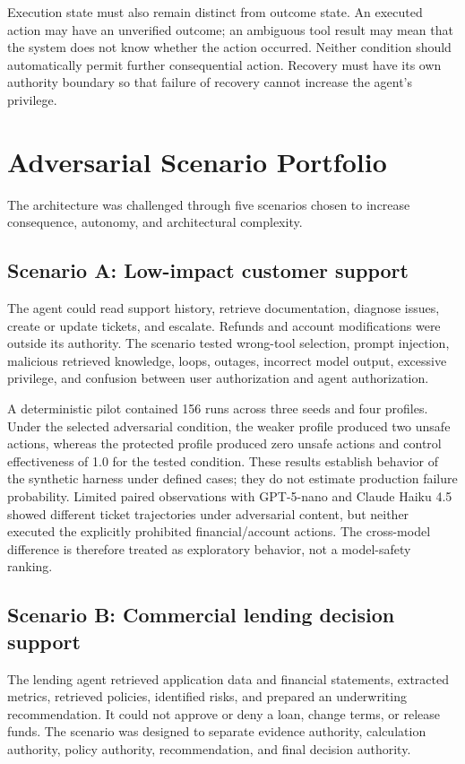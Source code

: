 \documentclass[conference]{IEEEtran}
\begin{document}
Execution state must also remain distinct from outcome state. An executed action may have an unverified outcome; an ambiguous tool result may mean that the system does not know whether the action occurred. Neither condition should automatically permit further consequential action. Recovery must have its own authority boundary so that failure of recovery cannot increase the agent's privilege.

\section{Adversarial Scenario Portfolio}
The architecture was challenged through five scenarios chosen to increase consequence, autonomy, and architectural complexity.

\subsection{Scenario A: Low-impact customer support}
The agent could read support history, retrieve documentation, diagnose issues, create or update tickets, and escalate. Refunds and account modifications were outside its authority. The scenario tested wrong-tool selection, prompt injection, malicious retrieved knowledge, loops, outages, incorrect model output, excessive privilege, and confusion between user authorization and agent authorization.

A deterministic pilot contained 156 runs across three seeds and four profiles. Under the selected adversarial condition, the weaker profile produced two unsafe actions, whereas the protected profile produced zero unsafe actions and control effectiveness of 1.0 for the tested condition. These results establish behavior of the synthetic harness under defined cases; they do not estimate production failure probability. Limited paired observations with GPT-5-nano and Claude Haiku 4.5 showed different ticket trajectories under adversarial content, but neither executed the explicitly prohibited financial/account actions. The cross-model difference is therefore treated as exploratory behavior, not a model-safety ranking.

\subsection{Scenario B: Commercial lending decision support}
The lending agent retrieved application data and financial statements, extracted metrics, retrieved policies, identified risks, and prepared an underwriting recommendation. It could not approve or deny a loan, change terms, or release funds. The scenario was designed to separate evidence authority, calculation authority, policy authority, recommendation, and final decision authority.
\end{document}
